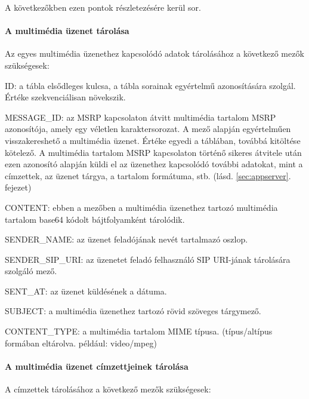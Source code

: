A következőkben ezen pontok részletezésére kerül sor.

\paragraph*{A multimédia üzenet tárolása\\}

Az  egyes multimédia üzenethez kapcsolódó adatok tárolásához a következő mezők szükségesek:

\begin{mydescription}
\item[ID:] a tábla elsődleges kulcsa, a tábla sorainak egyértelmű azonosítására szolgál. Értéke szekvenciálisan növekszik.
\item[MESSAGE\_ID:] az MSRP kapcsolaton átvitt multimédia tartalom MSRP azonosítója, amely egy véletlen karaktersorozat. A mező alapján egyértelműen visszakereshető a multimédia üzenet. Értéke egyedi a táblában, továbbá kitöltése kötelező. A multimédia tartalom MSRP kapcsolaton történő sikeres átvitele után ezen azonosító alapján küldi el az üzenethez kapcsolódó további adatokat, mint a címzettek, az üzenet tárgya, a tartalom formátuma, stb. (lásd. \ref{sec:appserver}.~ fejezet) 
\item[CONTENT:] ebben a mezőben a multimédia üzenethez tartozó multimédia tartalom base64 kódolt bájtfolyamként tárolódik.
\item[SENDER\_NAME:] az üzenet feladójának nevét tartalmazó oszlop.
\item[SENDER\_SIP\_URI:] az üzenetet feladó felhasználó SIP URI-jának tárolására szolgáló mező.
\item[SENT\_AT:] az üzenet küldésének a dátuma. 
\item[SUBJECT:] a multimédia üzenethez tartozó rövid szöveges tárgymező.
\item[CONTENT\_TYPE:] a multimédia tartalom MIME típusa. (típus/altípus formában eltárolva. például: video/mpeg)
\end{mydescription}
\medskip

\paragraph*{A multimédia üzenet címzettjeinek tárolása\\}

A címzettek tárolásához a következő mezők szükségesek:

